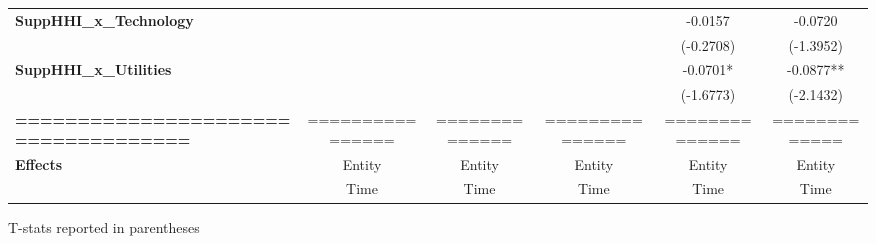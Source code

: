 \begin{center}
\begin{tabular}{lccccc}
\textbf{SuppHHI\_x\_Technology}               &                       &                        &                        &          -0.0157           &          -0.0720           \\
\textbf{ }                                    &                       &                        &                        &         (-0.2708)          &         (-1.3952)          \\
\textbf{SuppHHI\_x\_Utilities}                &                       &                        &                        &          -0.0701*          &         -0.0877**          \\
\textbf{ }                                    &                       &                        &                        &         (-1.6773)          &         (-2.1432)          \\
\textbf{====================================} &    ================   &     ==============     &    ===============     &       ==============       &       =============        \\
\textbf{Effects}                              &         Entity        &         Entity         &         Entity         &           Entity           &           Entity           \\
\textbf{}                                     &          Time         &          Time          &          Time          &            Time            &            Time            \\
\bottomrule
\end{tabular}
\end{center}

T-stats reported in parentheses